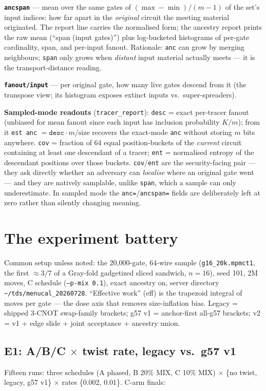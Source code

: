\documentclass[11pt]{article}
\newcommand{\code}[1]{\texttt{#1}}
\begin{document}
\textbf{\code{ancspan}} --- mean over the same gates of
$(\max - \min)/(m-1)$ of the set's input indices: how far apart in the
\emph{original} circuit the meeting material originated. The report line
carries the normalised form; the ancestry report prints the raw mean
(``span (input gates)'') plus log-bucketed histograms of per-gate
cardinality, span, and per-input fanout. Rationale: \code{anc} can grow by
merging neighbours; \code{span} only grows when \emph{distant} input
material actually meets --- it is the transport-distance reading.

\textbf{\code{fanout/input}} --- per original gate, how many live gates
descend from it (the transpose view; its histogram exposes extinct inputs
vs.\ super-spreaders).

\textbf{Sampled-mode readouts} (\code{tracer\_report}): \code{desc} = exact
per-tracer fanout (unbiased for mean fanout since each input has inclusion
probability $K/m$); from it \code{est anc} $= \code{desc}\cdot m /
\mathrm{size}$ recovers the exact-mode \code{anc} without storing $m$ bits
anywhere. \code{cov} = fraction of 64 equal position-buckets of the
\emph{current} circuit containing at least one descendant of a tracer;
\code{ent} = normalised entropy of the descendant positions over those
buckets. \code{cov}/\code{ent} are the security-facing pair --- they ask
directly whether an adversary can \emph{localise} where an original gate
went --- and they are natively samplable, unlike \code{span}, which a
sample can only underestimate. In sampled mode the \code{anc=}/\code{ancspan=}
fields are deliberately left at zero rather than silently changing meaning.

\section{The experiment battery}

Common setup unless noted: the 20{,}000-gate, 64-wire sample
(\code{g16\_20k.mpmct1}, the first ${\approx}3/7$ of a Gray-fold gadgetized
sliced sandwich, $n{=}16$), seed 101, 2M moves, C schedule
(\code{--p-mix 0.1}), exact ancestry on, server directory
\code{\textasciitilde/tds/menucal\_20260728}. ``Effective work'' (eff) is
the trapezoid integral of moves per gate --- the dose axis that removes
size-inflation bias. Legacy = shipped 3-CNOT swap-family brackets; g57 v1 =
anchor-first all-g57 brackets; v2 = v1 + edge slide + joint acceptance +
ancestry union.

\subsection{E1: A/B/C $\times$ twist rate, legacy vs.\ g57 v1}
Fifteen runs: three schedules (A phased, B 20\% MIX, C 10\% MIX) $\times$
\{no twist, legacy, g57 v1\} $\times$ rates \{0.002, 0.01\}. C-arm finals:
\end{document}

